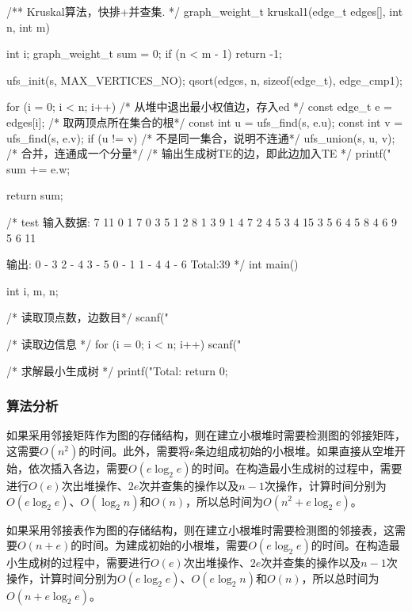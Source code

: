 \begin{Codex}[label=kruskal.c]
/** Kruskal算法，快排+并查集. */
graph_weight_t kruskal1(edge_t edges[], int n, int m) {
    int i;
    graph_weight_t sum = 0;
    if (n < m - 1) return -1;

    ufs_init(s, MAX_VERTICES_NO);
    qsort(edges, n, sizeof(edge_t), edge_cmp1);

    for (i = 0; i < n; i++) {
        /* 从堆中退出最小权值边，存入ed */
        const edge_t e = edges[i];
        /* 取两顶点所在集合的根*/
        const int u = ufs_find(s, e.u);
        const int v = ufs_find(s, e.v);
        if (u != v) { /* 不是同一集合，说明不连通*/
            ufs_union(s, u, v); /* 合并，连通成一个分量*/
            /* 输出生成树TE的边，即此边加入TE */
            printf("%
            sum += e.w;
        }
    }

    return sum;
}

/* test
输入数据:
7 11
0 1 7
0 3 5
1 2 8
1 3 9
1 4 7
2 4 5
3 4 15
3 5 6
4 5 8
4 6 9
5 6 11

输出:
0 - 3
2 - 4
3 - 5
0 - 1
1 - 4
4 - 6
Total:39
*/
int main() {
    int i, m, n;

    /* 读取顶点数，边数目*/
    scanf("%

    /* 读取边信息 */
    for (i = 0; i < n; i++) {
        scanf("%
    }

    /* 求解最小生成树 */
    printf("Total:%
    return 0;
}
\end{Codex}

\subsubsection{算法分析}
如果采用邻接矩阵作为图的存储结构，则在建立小根堆时需要检测图的邻接矩阵，这需要$O(n^2)$的时间。此外，需要将$e$条边组成初始的小根堆。如果直接从空堆开始，依次插入各边，需要$O(e\log_2e)$的时间。在构造最小生成树的过程中，需要进行$O(e)$次出堆操作、$2e$次并查集的操作以及$n-1$次操作，计算时间分别为$O(e\log_2e)$、$O(\log_2n)$和$O(n)$，所以总时间为$O(n^2+e\log_2e)$。

如果采用邻接表作为图的存储结构，则在建立小根堆时需要检测图的邻接表，这需要$O(n+e)$的时间。为建成初始的小根堆，需要$O(e\log_2e)$的时间。在构造最小生成树的过程中，需要进行$O(e)$次出堆操作、$2e$次并查集的操作以及$n-1$次操作，计算时间分别为$O(e\log_2e)$、$O(e\log_2n)$和$O(n)$，所以总时间为$O(n+e\log_2e)$。


